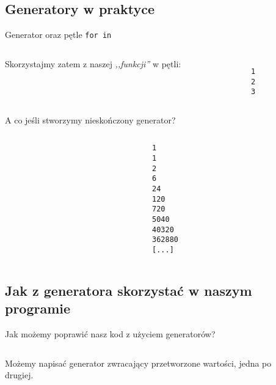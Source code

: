 \documentclass[aspectratio=169]{beamer}
\begin{document}
\subsection{Generatory w praktyce}
\begin{frame}[fragile]{Generator oraz pętle \texttt{for in}}
  \begin{columns}
    \begin{column}{0.5 \textwidth}
      Skorzystajmy zatem z naszej \emph{,,funkcji''} w pętli:
    \end{column}
    \begin{column}{0.5 \textwidth}
      \scriptsize
      \inputminted[linenos]{python}{./examples/geninfor.py}
      \pause
      \begin{verbatim}
1
2
3
      \end{verbatim}
    \end{column}
  \end{columns}
\end{frame}

\begin{frame}[fragile]{A co jeśli stworzymy nieskończony generator?}
  \begin{columns}
    \begin{column}{0.5 \textwidth}
      \scriptsize
      \inputminted[linenos]{python}{./examples/silnia.py}
    \end{column}
    \begin{column}{0.5 \textwidth}
      \pause
      \begin{verbatim}
1
1
2
6
24
120
720
5040
40320
362880
[...]
      \end{verbatim}
    \end{column}
  \end{columns}
\end{frame}

\subsection{Jak z generatora skorzystać w naszym programie}
\begin{frame}[fragile]{Jak możemy poprawić nasz kod z użyciem generatorów?}
  \begin{columns}
    \begin{column}{0.5 \textwidth}
      Możemy napisać generator zwracający przetworzone wartości, jedna po
      drugiej.
    \end{column}
    \begin{column}{0.5 \textwidth}
      \scriptsize
      \inputminted[linenos]{python}{./examples/generator.py}
    \end{column}
  \end{columns}
\end{frame}
\end{document}
